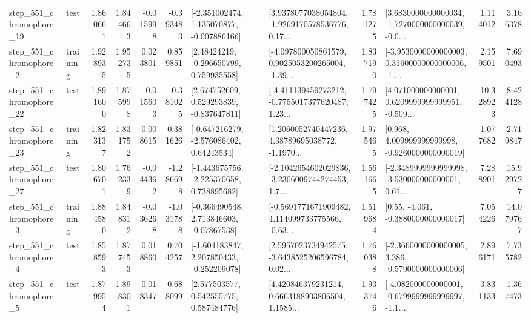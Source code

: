 \begin{tabular}{llrrrrllrlrr}
  step\_551\_chromophore\_19 &      test &      1.860661 &    1.844663 &     -0.015998 & -0.393483 &   [-2.351002474, 1.135070877, -0.007886166] &  [3.9378077038054804, -1.9269170578536776, 0.17... &       1.781275 &  [3.6830000000000034, -1.7270000000000039, -0.0... &            1.114012 &          3.166378 \\
   step\_551\_chromophore\_2 &  training &      1.928935 &    1.952735 &      0.023801 &  0.859851 &     [2.48424219, -0.296650799, 0.759935558] &  [-4.097800050861579, 0.9025053200265004, -1.39... &       1.837190 &  [-3.9530000000000003, 0.31600000000000006, -1.... &            2.159501 &          7.690493 \\
  step\_551\_chromophore\_22 &      test &      1.891600 &    1.875998 &     -0.015603 & -0.381025 &    [2.674752609, 0.529293839, -0.837647811] &  [-4.411139459273212, -0.7755017377620487, 1.23... &       1.797425 &  [4.071000000000001, 0.6209999999999951, -0.509... &           10.328923 &          8.424128 \\
  step\_551\_chromophore\_23 &  training &      1.823137 &    1.831752 &      0.008615 &  0.381626 &    [-0.647216279, -2.576086402, 0.64243534] &  [1.2060052740447236, 4.38789695038772, -1.1970... &       1.975465 &    [0.968, 4.009999999999998, -0.9260000000000019] &            1.077682 &          2.719847 \\
  step\_551\_chromophore\_27 &      test &      1.806701 &    1.762339 &     -0.044362 & -1.286698 &   [-1.443675756, -2.225370658, 0.738895682] &  [-2.1042654602029836, -3.2306009744274453, 1.7... &       1.561665 &  [-2.3489999999999998, -3.530000000000001, 0.61... &            7.288901 &         15.929727 \\
   step\_551\_chromophore\_3 &  training &      1.884580 &    1.848312 &     -0.036268 & -1.031788 &    [-0.366490548, 2.713846603, -0.07867538] &  [-0.5691771671909482, 4.114099733775566, -0.63... &       1.519684 &                [0.55, -4.061, -0.3880000000000017] &            7.054226 &         14.079767 \\
   step\_551\_chromophore\_4 &      test &      1.858593 &    1.877453 &      0.018860 &  0.704257 &   [-1.604183847, 2.207850433, -0.252209078] &  [2.5957023734942575, -3.6438525206596784, 0.02... &       1.760388 &  [-2.3660000000000005, 3.386, -0.5790000000000006] &            2.896171 &          7.735782 \\
   step\_551\_chromophore\_5 &      test &      1.879954 &    1.898301 &      0.018347 &  0.688099 &     [2.577503577, 0.542555775, 0.587484776] &  [4.420846379231214, 0.6663188903806504, 1.1585... &       1.933746 &  [-4.082000000000001, -0.6799999999999997, -1.1... &            3.831133 &          1.367473 \\

\end{tabular}
